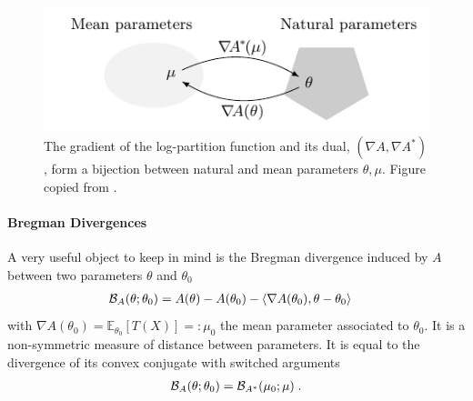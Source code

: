 \documentclass[twoside]{article}
\newcommand*{\expect}[2][]{\ensuremath{\mathbb{E}_{#1} \left[ #2 \right] }} %
\newcommand{\logpart}{A}
\newcommand{\conj}{\logpart^*}
\newcommand{\bregman}{\cB_\logpart}
\newcommand{\bregmanconj}{\cB_{\logpart^*}}
\newcommand{\natp}{\theta}
\newcommand{\meanp}{\mu}
\begin{document}
\begin{figure}[ht]
	\centering
	\includegraphics{duality}
	\caption{The gradient of the log-partition function and its dual, $(\nabla \logpart, \nabla \conj)$, form a bijection between natural and mean parameters $\natp, \meanp$. Figure copied from \citet{kunstner2020homeomorphic}. %
	}
	\label{fig:duality}
\end{figure}

\paragraph{Bregman Divergences}
A very useful object to keep in mind is the Bregman divergence induced by $\logpart$ between two parameters $\natp$ and $\natp_0$
\begin{align}
    \bregman (\natp ; \natp_0)
    & = \logpart(\natp) - \logpart(\natp_0) 
    - \langle \nabla \logpart(\natp_0)  , \natp - \natp_0 \rangle
\end{align}
with $\nabla \logpart(\natp_0) = \expect[\natp_0]{T(X)} =: \meanp_0$ the mean parameter associated to $\natp_0$. 
It is a non-symmetric measure of distance between parameters.
It is equal to the divergence of its convex conjugate with switched arguments
\begin{align}
	\bregman (\natp ; \natp_0)
    = \bregmanconj ( \meanp_0 ; \meanp) \; .
\end{align}
\end{document}

